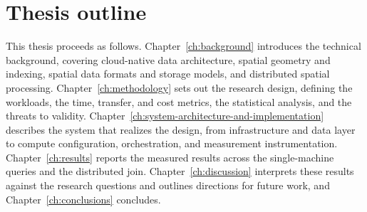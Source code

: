 \section{Thesis outline}
\label{introduction:thesis-outline}
This thesis proceeds as follows. Chapter~\ref{ch:background} introduces the technical background, covering cloud-native data architecture, spatial geometry and indexing, spatial data formats and storage models, and distributed spatial processing. Chapter~\ref{ch:methodology} sets out the research design, defining the workloads, the time, transfer, and cost metrics, the statistical analysis, and the threats to validity. Chapter~\ref{ch:system-architecture-and-implementation} describes the system that realizes the design, from infrastructure and data layer to compute configuration, orchestration, and measurement instrumentation. Chapter~\ref{ch:results} reports the measured results across the single-machine queries and the distributed join. Chapter~\ref{ch:discussion} interprets these results against the research questions and outlines directions for future work, and Chapter~\ref{ch:conclusions} concludes.